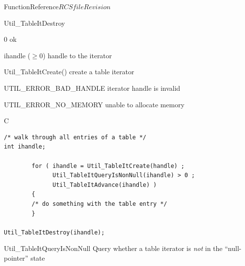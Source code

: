 \begin{cactuspart}{FunctionReference}{$RCSfile$}{$Revision$}
\begin{FunctionDescription}{Util\_TableItDestroy}
\begin{ResultSection}
\begin{Result}{\rm 0}
ok
\end{Result}
\end{ResultSection}

\begin{ParameterSection}
\begin{Parameter}{ihandle ($\ge 0$)}
handle to the iterator
\end{Parameter}
\end{ParameterSection}

\begin{Discussion}
\end{Discussion}

\begin{SeeAlsoSection}
\begin{SeeAlso}{Util\_TableItCreate()}
create a table iterator
\end{SeeAlso}
\end{SeeAlsoSection}

\begin{ErrorSection}
\begin{Error}{UTIL\_ERROR\_BAD\_HANDLE}
iterator handle is invalid
\end{Error}
\begin{Error}{UTIL\_ERROR\_NO\_MEMORY}
unable to allocate memory
\end{Error}
\end{ErrorSection}

\begin{ExampleSection}
\begin{Example}{C}
\begin{verbatim}
/* walk through all entries of a table */
int ihandle;

        for ( ihandle = Util_TableItCreate(handle) ;
              Util_TableItQueryIsNonNull(ihandle) > 0 ;
              Util_TableItAdvance(ihandle) )
        {
        /* do something with the table entry */
        }

Util_TableItDestroy(ihandle);
\end{verbatim}
\end{Example}
\end{ExampleSection}
\end{FunctionDescription}


\begin{FunctionDescription}{Util\_TableItQueryIsNonNull}
\label{Util-TableItQueryIsNonNull}
Query whether a table iterator is {\em not\/} in the ``null-pointer'' state


\end{FunctionDescription}
\end{cactuspart}

